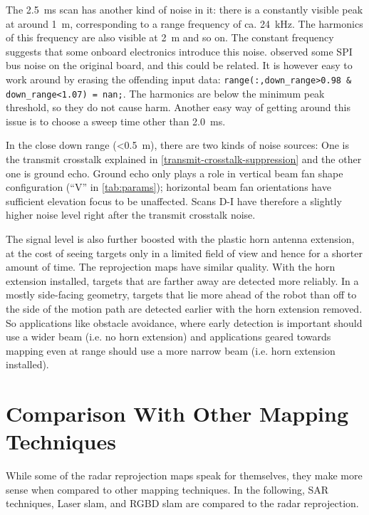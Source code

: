 The \SI{2.5}{ms} scan has another kind of noise in it: there is a constantly visible peak at around \SI{1}{m}, corresponding to a range frequency of ca. \SI{24}{kHz}. The harmonics of this frequency are also visible at \SI{2}{m} and so on. The constant frequency suggests that some onboard electronics introduce this noise. \cite{Ernst2016} observed some SPI bus noise on the original board, and this could be related. It is however easy to work around by erasing the offending input data: \texttt{range(:,down\_range>0.98 \& down\_range<1.07) = nan;}. The harmonics are below the minimum peak threshold, so they do not cause harm. Another easy way of getting around this issue is to choose a sweep time other than \SI{2.0}{ms}.

In the close down range (<\SI{0.5}{m}), there are two kinds of noise sources: One is the transmit crosstalk explained in \cref{transmit-crosstalk-suppression} and the other one is ground echo. Ground echo only plays a role in vertical beam fan shape configuration (``V'' in \cref{tab:params}); horizontal beam fan orientations have sufficient elevation focus to be unaffected. Scans D-I have therefore a slightly higher noise level right after the transmit crosstalk noise.

The signal level is also further boosted with the plastic horn antenna extension, at the cost of seeing targets only in a limited field of view and hence for a shorter amount of time. The reprojection maps have similar quality. With the horn extension installed, targets that are farther away are detected more reliably. In a mostly side-facing geometry, targets that lie more ahead of the robot than off to the side of the motion path are detected earlier with the horn extension removed. So applications like obstacle avoidance, where early detection is important should use a wider beam (i.e. no horn extension) and applications geared towards mapping even at range should use a more narrow beam (i.e. horn extension installed).



\section{Comparison With Other Mapping Techniques} \label{comparison-with-other-mapping-techniques}
While some of the radar reprojection maps speak for themselves, they
make more sense when compared to other mapping techniques. In the
following, SAR techniques, Laser slam, and RGBD slam are compared to the
radar reprojection.


